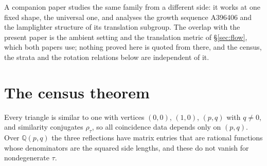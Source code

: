 \documentclass[11pt]{article}
\theoremstyle{definition}
\theoremstyle{remark}
\newcommand{\Q}{\mathbb{Q}}
\begin{document}
A companion paper \cite{Bonfioli1} studies the same family from a different
side: it works at one fixed shape, the universal one, and analyses the growth
sequence \textup{A396406} and the lamplighter structure of its translation
subgroup. The overlap with the present paper is the ambient setting and the
translation metric of \S\ref{sec:flow}, which both papers use; nothing proved
here is quoted from there, and the census, the strata and the rotation
relations below are independent of it.

\section{The census theorem}\label{sec:census}

Every triangle is similar to one with vertices $(0,0)$, $(1,0)$, $(p,q)$ with
$q\neq0$, and similarity conjugates $\rho_\tau$, so all coincidence data depends
only on $(p,q)$. Over $\Q(p,q)$ the three reflections have matrix entries that
are rational functions whose denominators are the squared side lengths, and
these do not vanish for nondegenerate $\tau$.
\end{document}
